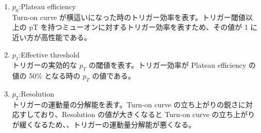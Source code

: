 \begin{enumerate}\label{table:fitting}
   \item $p_0$:Plateau efficiency\\
   Turn-on curve が横這いになった時のトリガー効率を表す。トリガー閾値以上の pT を持つミューオンに対するトリガー効率を表すため、その値が 1 に近い方が高性能である。
   \item $p_1$:Effective threshold\\
   トリガーの実効的な $p_T$ の閾値を表す。トリガー効率が Plateau efficiency の値の 50\% となる時の $p_T$ の値である。
   \item $p_2$:Resolution\\
   トリガーの運動量の分解能を表す。Turn-on curve の立ち上がりの鋭さに対応すしており、Resolution の値が大きくなると Turn-on curve の立ち上がりが緩くなるため、、トリガーの運動量分解能が悪くなる。
\end{enumerate}


